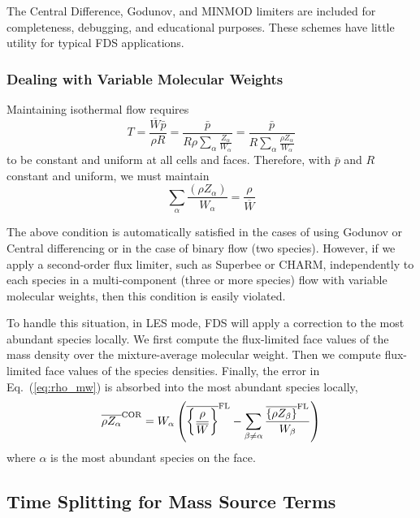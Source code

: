 The Central Difference, Godunov, and MINMOD limiters are included for completeness, debugging, and educational purposes.  These schemes have little utility for typical FDS applications.

\subsubsection{Dealing with Variable Molecular Weights}

Maintaining isothermal flow requires
\begin{equation}
T = \frac{\overline{W} \bar{p}}{\rho R} = \frac{\bar{p}}{R \rho \sum_\alpha \frac{Z_\alpha}{W_\alpha}} = \frac{\bar{p}}{R \sum_\alpha \frac{\rho Z_\alpha}{W_\alpha}}
\end{equation}
to be constant and uniform at all cells and faces. Therefore, with $\bar{p}$ and $R$ constant and uniform, we must maintain
\begin{equation}
\label{eq:rho_mw}
\sum_\alpha \frac{(\rho Z_\alpha)}{W_\alpha} = \frac{\rho}{\overline{W}}
\end{equation}

The above condition is automatically satisfied in the cases of using Godunov or Central differencing or in the case of binary flow (two species).  However, if we apply a second-order flux limiter, such as Superbee or CHARM, independently to each species in a multi-component (three or more species) flow with variable molecular weights, then this condition is easily violated.

To handle this situation, in LES mode, FDS will apply a correction to the most abundant species locally.  We first compute the flux-limited face values of the mass density over the mixture-average molecular weight.  Then we compute flux-limited face values of the species densities.  Finally, the error in Eq.~(\ref{eq:rho_mw}) is absorbed into the most abundant species locally,
\begin{equation}
\label{eq:rhoZ_cor}
\overline{\rho Z_\alpha}^{\rm COR} = W_\alpha \left( \overline{\left\{\frac{\rho}{\overline{W}}\right\}}^{\rm FL} - \sum_{\beta \ne \alpha} \frac{\overline{\{\rho Z_\beta\}}^{\rm FL}}{W_\beta} \right)
\end{equation}
where $\alpha$ is the most abundant species on the face.

\subsection{Time Splitting for Mass Source Terms}
\label{sec_time_splitting}

